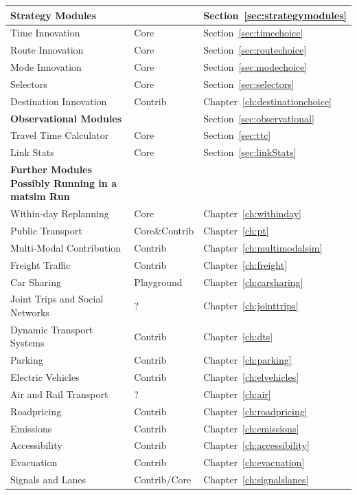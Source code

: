 \begin{center}
\begin{longtable}{|l|l|l|}
	\hline
	\textbf{Strategy Modules} & & Section~\ref{sec:strategymodules} \\
	\hline
	Time Innovation & Core & Section~\ref{sec:timechoice} \\
	Route Innovation & Core & Section~\ref{sec:routechoice} \\
	Mode Innovation & Core & Section~\ref{sec:modechoice} \\
	Selectors & Core & Section~\ref{sec:selectors} \\
	Destination Innovation & Contrib & Chapter~\ref{ch:destinationchoice} \\
	\hline
	\textbf{Observational Modules} & & Section~\ref{sec:observational} \\
	\hline
	Travel Time Calculator & Core & Section~\ref{sec:ttc} \\
	Link Stats & Core & Section~\ref{sec:linkStats} \\
	\hline
	\textbf{Further Modules Possibly Running in a \gls{matsim} Run} & &\\
	\hline
	Within-day Replanning & Core & Chapter~\ref{ch:withinday} \\
	Public Transport & Core\&Contrib & Chapter~\ref{ch:pt} \\
	Multi-Modal Contribution & Contrib & Chapter~\ref{ch:multimodalsim} \\ %
	Freight Traffic & Contrib & Chapter~\ref{ch:freight} \\
	Car Sharing & Playground & Chapter~\ref{ch:carsharing} \\
	Joint Trips and Social Networks & ? & Chapter~\ref{ch:jointtrips} \\
	Dynamic Transport Systems & Contrib & Chapter~\ref{ch:dts} \\
	Parking & Contrib & Chapter~\ref{ch:parking} \\
	Electric Vehicles & Contrib & Chapter~\ref{ch:elvehicles} \\
	Air and Rail Transport & ? & Chapter~\ref{ch:air} \\
	Roadpricing & Contrib & Chapter~\ref{ch:roadpricing} \\
	Emissions & Contrib & Chapter~\ref{ch:emissions} \\
	Accessibility & Contrib & Chapter~\ref{ch:accessibility} \\
	Evacuation & Contrib & Chapter~\ref{ch:evacuation}  \\
	Signals and Lanes & Contrib/Core& Chapter~\ref{ch:signalslanes} \\

\end{longtable}
\end{center}

